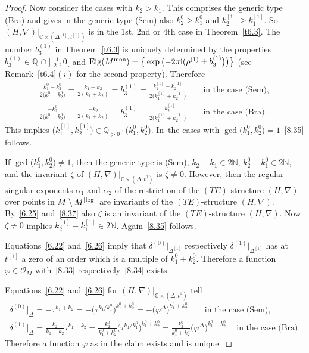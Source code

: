 \documentclass[10pt,a4paper]{amsart}
\numberwithin{equation}{section}
\numberwithin{figure}{section}
\newcommand{\N}{{\mathbb N}}
\newcommand{\Q}{{\mathbb Q}}
\newcommand{\C}{{\mathbb C}}
\newcommand{\OO}{{\mathcal O}}
\newcommand{\nnn}{\nabla}
\DeclareMathOperator{\Eig}{Eig}
\begin{document}
\begin{proof}
Now consider the cases with $k_2>k_1$.
This comprises the generic type (Bra) and
gives in the generic type (Sem) also $k_2^0>k_1^0$
and $k_2^{[1]}>k_1^{[1]}$.
So $(H,\nnn)|_{\C\times(\Delta^{[1]},t^{[1]})}$ is
in the 1st, 2nd or 4th case in Theorem~\ref{t6.3}.
The number $b_3^{(1)}$ in Theorem~\ref{t6.3} is uniquely
determined by the properties
$b_3^{(1)}\in\Q\,\cap \big]\frac{-1}{2},0\big[$ and
$\Eig(M^{\rm mon})=\big\{\exp\big({-}2\pi {\rm i} (\rho^{(1)}\pm b_3^{(1)}\big)\big)\big\}$
(see Remark~\ref{t6.4}$(i)$ for the second property).
Therefore
\begin{gather}
\frac{k_1^0-k_2^0}{2\big(k_1^0+k_2^0\big)}
=\frac{k_1-k_2}{2(k_1+k_2)} =b_3^{(1)}
=\frac{k_1^{[1]}-k_2^{[1]}}{2\big(k_1^{[1]}+k_2^{[1]}\big)}\qquad
\text{in the case (Sem)},\nonumber
\\
\frac{-k_2^0}{2\big(k_1^0+k_2^0\big)}
=\frac{-k_2}{2(k_1+k_2)} =b_3^{(1)}
=\frac{-k_2^{[1]}}{2\big(k_1^{[1]}+k_2^{[1]}\big)}\qquad
\text{in the case (Bra)}.\label{8.37}
\end{gather}
This implies $\big(k_1^{[1]},k_2^{[1]}\big)\in
\Q_{>0}\cdot\big(k_1^0,k_2^0\big)$. In~the cases with $\gcd\big(k_1^0,k_2^0\big)=1$~\eqref{8.35} follows.

If $\gcd\big(k_1^0,k_2^0\big)\neq 1$, then the generic type
is (Sem), $k_2-k_1\in 2\N$, $k_2^0-k_1^0\in 2\N$,
and the invariant $\zeta$ of
$(H,\nnn)|_{\C\times(\Delta,t^0)}$ is $\zeta\neq 0$.
However, then the regular singular
exponents $\alpha_1$ and $\alpha_2$ of the restriction
of the $(TE)$-structure $(H,\nnn)$ over points in
$M\setminus M^{\rm [log]}$ are invariants of the $(TE)$-structure
$(H,\nnn)$. By~\eqref{6.25} and~\eqref{8.37}
also $\zeta$ is an invariant of the $(TE)$-structure
$(H,\nnn)$. Now $\zeta\neq 0$ implies
$k_2^{[1]}-k_1^{[1]}\in 2\N$. Again~\eqref{8.35} follows.

Equations~\eqref{6.22} and~\eqref{6.26} imply that
$\delta^{(0)}|_{\Delta^{[1]}}$
respectively $\delta^{(1)}|_{\Delta^{[1]}}$
has at $t^{[1]}$ a zero of an order which is a multiple of
$k_1^0+k_2^0$. Therefore a function $\varphi\in\OO_M$
with~\eqref{8.33} respectively~\eqref{8.34} exists.

Equations~\eqref{6.22} and~\eqref{6.26} for $(H,\nnn)|_{\C\times(\Delta,t^0)}$
tell
\begin{gather*}
\delta^{(0)}|_\Delta = -\tau^{k_1+k_2}
=-\big(\tau^{k_1/k_1^0}\big)^{k_1^0+k_2^0}
=-\big(\varphi^\Delta\big)^{k_1^0+k_2^0}\qquad
\text{in the case (Sem),}
\\
\delta^{(1)}|_\Delta = \frac{k_2}{k_1+k_2}\tau^{k_1+k_2}
=\frac{k_2^0}{k_1^0+k_2^0}\big(\tau^{k_1/k_1^0}\big)^{k_1^0+k_2^0}
=\frac{k_2^0}{k_1^0+k_2^0}\big(\varphi^\Delta\big)^{k_1^0+k_2^0}\quad\
\text{in the case (Bra).}
\end{gather*}
Therefore a function $\varphi$ as in the claim exists
and is unique.
\end{proof}
\end{document}
